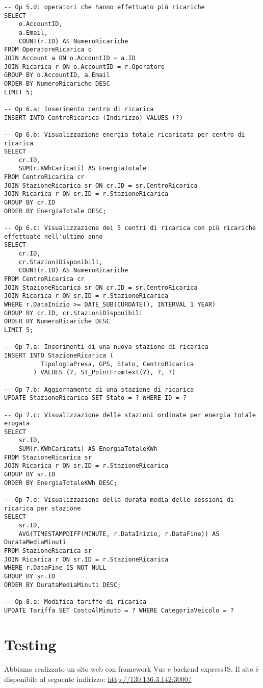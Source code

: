 \documentclass{article}
\begin{document}
\begin{lstlisting}
-- Op 5.d: operatori che hanno effettuato più ricariche
SELECT 
    o.AccountID,
    a.Email,
    COUNT(r.ID) AS NumeroRicariche
FROM OperatoreRicarica o
JOIN Account a ON o.AccountID = a.ID
JOIN Ricarica r ON o.AccountID = r.Operatore
GROUP BY o.AccountID, a.Email
ORDER BY NumeroRicariche DESC
LIMIT 5;

-- Op 6.a: Inserimento centro di ricarica
INSERT INTO CentroRicarica (Indirizzo) VALUES (?)

-- Op 6.b: Visualizzazione energia totale ricaricata per centro di ricarica
SELECT 
    cr.ID,
    SUM(r.KWhCaricati) AS EnergiaTotale
FROM CentroRicarica cr
JOIN StazioneRicarica sr ON cr.ID = sr.CentroRicarica
JOIN Ricarica r ON sr.ID = r.StazioneRicarica
GROUP BY cr.ID
ORDER BY EnergiaTotale DESC;

-- Op 6.c: Visualizzazione dei 5 centri di ricarica con più ricariche effettuate nell'ultimo anno
SELECT 
    cr.ID,
    cr.StazioniDisponibili,
    COUNT(r.ID) AS NumeroRicariche
FROM CentroRicarica cr
JOIN StazioneRicarica sr ON cr.ID = sr.CentroRicarica
JOIN Ricarica r ON sr.ID = r.StazioneRicarica
WHERE r.DataInizio >= DATE_SUB(CURDATE(), INTERVAL 1 YEAR)
GROUP BY cr.ID, cr.StazioniDisponibili
ORDER BY NumeroRicariche DESC
LIMIT 5;

-- Op 7.a: Inserimenti di una nuova stazione di ricarica
INSERT INTO StazioneRicarica (
          TipologiaPresa, GPS, Stato, CentroRicarica
        ) VALUES (?, ST_PointFromText(?), ?, ?)

-- Op 7.b: Aggiornamento di una stazione di ricarica
UPDATE StazioneRicarica SET Stato = ? WHERE ID = ?

-- Op 7.c: Visualizzazione delle stazioni ordinate per energia totale erogata
SELECT 
    sr.ID,
    SUM(r.KWhCaricati) AS EnergiaTotaleKWh
FROM StazioneRicarica sr
JOIN Ricarica r ON sr.ID = r.StazioneRicarica
GROUP BY sr.ID
ORDER BY EnergiaTotaleKWh DESC;

-- Op 7.d: Visualizzazione della durata media delle sessioni di ricarica per stazione
SELECT 
    sr.ID,
    AVG(TIMESTAMPDIFF(MINUTE, r.DataInizio, r.DataFine)) AS DurataMediaMinuti
FROM StazioneRicarica sr
JOIN Ricarica r ON sr.ID = r.StazioneRicarica
WHERE r.DataFine IS NOT NULL
GROUP BY sr.ID
ORDER BY DurataMediaMinuti DESC;

-- Op 8.a: Modifica tariffe di ricarica
UPDATE Tariffa SET CostoAlMinuto = ? WHERE CategoriaVeicolo = ?
\end{lstlisting}

\section{Testing}

Abbiamo realizzato un sito web con framework Vue e backend expressJS. Il sito è disponibile al seguente indirizzo: \url{http://130.136.3.142:3000/}
\end{document}
